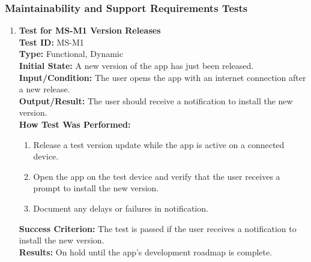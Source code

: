 \documentclass[12pt, titlepage]{article}
\begin{document}
\subsubsection{Maintainability and Support Requirements Tests}
\begin{enumerate}
    \item \textbf{Test for MS-M1 Version Releases} \\
      \newline
      \textbf{Test ID:} MS-M1 \\
      \textbf{Type:} Functional, Dynamic \\
      \textbf{Initial State:} A new version of the app has just been released. \\
      \textbf{Input/Condition:} The user opens the app with an internet connection after a new release. \\
      \textbf{Output/Result:} The user should receive a notification to install the new version. \\
      \textbf{How Test Was Performed:}
      \begin{enumerate}
          \item Release a test version update while the app is active on a connected device.
          \item Open the app on the test device and verify that the user receives a prompt to install the new version.
          \item Document any delays or failures in notification.
      \end{enumerate}
      \textbf{Success Criterion:} The test is passed if the user receives a notification to install the new version.\\
      \textbf{Results:} On hold until the app's development roadmap is complete.\\


\end{enumerate}
\end{document}
